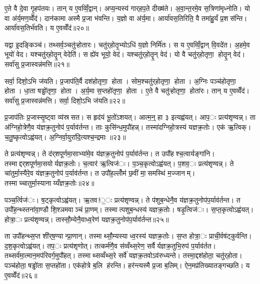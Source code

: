 ए॒ते वै दे॒वा गृ॒हप॑तयः। तान् य ए॒वव्विँ॒द्वान्। अप्य॒न्यस्य॑ गार्‌हप॒ते दीख्ष॑ते। अ॒वा॒न्त॒रमे॒व स॒त्रिणा॑मृध्नोति। यो वा अ॑र्य॒मण॒व्वेँद॑। दान॑कामा अस्मै प्र॒जा भ॑वन्ति। य॒ज्ञो वा अ॑र्य॒मा। आर्या॑वस॒तिरिति॒ वै तमा॑हु॒र्यं प्र॒शस॑न्ति। आर्या॑वस॒तिर्भ॑वति। य ए॒वव्वेँद॑॥२०॥

यद्वा इ॒दङ्किञ्च॑। तथ्सर्व॒ञ्चतु॑ऱ्होतारः। चतु॑र्‌होतृ॒भ्योऽधि॑ य॒ज्ञो निर्मि॑तः। स य ए॒वव्विँ॒द्वान्‌ वि॒वदे॑त। अ॒हमे॒व भूयो॑ वेद। यश्चतु॑र्‌होतॄ॒न् वेदेति॑। स ह्ये॑व भूयो॒ वेद॑। यश्चतु॑र्‌होतॄ॒न् वेद॑। यो वै चतु॑र्‌होतृणा॒ होतॄ॒न् वेद॑। सर्वा॑सु प्र॒जास्वन्न॑मत्ति॥२१॥

सर्वा॒ दिशो॒ऽभि ज॑यति। प्र॒जाप॑ति॒र्वै दश॑होतृणा॒ होता। सोम॒श्चतु॑र्‌होतृणा॒ होता। अ॒ग्निः पञ्च॑होतृणा॒ होता। धा॒ता षड्ढो॑तृणा॒ होता। अ॒र्य॒मा स॒प्तहो॑तृणा॒ होता। ए॒ते वै चतु॑ऱ्होतृणा॒ होता॑रः। तान् य ए॒वव्वेँद॑। सर्वा॑सु प्र॒जास्वन्न॑मत्ति। सर्वा॒ दिशो॒ऽभि ज॑यति॥२२॥


प्र॒जाप॑तिः प्र॒जास्सृ॒ष्ट्वा व्य॑स्रसत। स हृद॑यं भू॒तो॑ऽशयत्। आत्म॒न्॒ हा ३ इत्यह्व॑यत्। आप॒ः प्रत्य॑शृण्वन्न्। ता अ॑ग्निहो॒त्रेणै॒व य॑ज्ञक्र॒तुनोप॑ प॒र्याव॑र्तन्त। ताः कुसि॑न्ध॒मुपौ॑हन्न्। तस्मा॑दग्निहो॒त्रस्य॑ यज्ञक्र॒तोः। एक॑ ऋ॒त्विक्। च॒तु॒ष्कृत्वोऽह्व॑यत्। अ॒ग्निर्वा॒युरा॑दि॒त्यश्च॒न्द्रमाः॥२३॥

ते प्रत्य॑शृण्वन्न्। ते द॑र्‌शपूर्णमा॒साभ्या॑मे॒व य॑ज्ञक्र॒तुनोप॑ प॒र्याव॑र्तन्त। त उपौ॑हश्च॒त्वार्यङ्गा॑नि। तस्माद्दर्‌शपूर्णमा॒सयोर्यज्ञक्र॒तोः। च॒त्वार॑ ऋ॒त्विज॑ः। प॒ञ्च॒कृत्वोऽह्व॑यत्। प॒शव॒ः प्रत्य॑शृण्वन्न्। ते चा॑तुर्मा॒स्यैरे॒व य॑ज्ञक्र॒तुनोप॑ प॒र्याव॑र्तन्त। त उपौ॑ह॒ल्लोँम॑ छ॒वीं मा॒समस्थि॑ म॒ज्जानम्। तस्माच्चातुर्मा॒स्यानाय्यँज्ञक्र॒तोः॥२४॥

पञ्च॒र्त्विज॑ः। ष॒ट्कृत्वोऽह्व॑यत्। ऋ॒तव!॒ः प्रत्य॑शृण्वन्न्। ते प॑शुब॒न्धेनै॒व य॑ज्ञक्र॒तुनोप॑प॒र्याव॑र्तन्त। त उपौ॑ह॒न्थ्स्तना॑वा॒ण्डौ शि॒श्ञमवाञ्चं प्रा॒णम्। तस्मात्पशुब॒न्धस्य॑ यज्ञक्र॒तोः। षडृ॒त्विज॑ः। स॒प्त॒कृत्वोऽह्व॑यत्। होत्रा॒ः प्रत्य॑शृण्वन्न्। तास्सौ॒म्येनै॒वाध्व॒रेण॑ यज्ञक्र॒तुनोप॑प॒र्याव॑र्तन्त॥२५॥

ता उपौ॑हन्थ्स॒प्त शी॑र्‌ष॒ण्यान्प्रा॒णान्। तस्माथ्सौ॒म्यस्याध्व॒रस्य॑ यज्ञक्र॒तोः। स॒प्त होत्रा॒ः प्राची॒र्वष॑ट्कुर्वन्ति। द॒श॒कृत्वोऽह्व॑यत्। तप॒ः प्रत्य॑शृणोत्। तत्कर्म॑णै॒व स॑व्वँथ्स॒रेण॒ सर्वैर्यज्ञक्र॒तुभि॒रुप॑ प॒र्याव॑र्तत। तथ्सर्व॑मा॒त्मान॒मप॑रिवर्ग॒मुपौ॑हत्। तस्माथ्सव्वँथ्स॒रे सर्वे॑ यज्ञक्र॒तवोऽव॑रुध्यन्ते। तस्मा॒द्दश॑होता॒ चतु॑र्‌होता। पञ्च॑होता॒ षड्ढो॑ता स॒प्तहो॑ता। एक॑होत्रे ब॒लि ह॑रन्ति। हर॑न्त्यस्मै प्र॒जा ब॒लिम्। ऐन॒मप्र॑तिख्यातङ्गच्छति। य ए॒वव्वेँद॑॥२६॥

